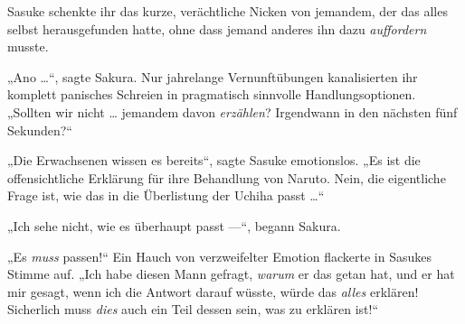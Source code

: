 Sasuke schenkte ihr das kurze, verächtliche Nicken von jemandem, der das alles selbst herausgefunden hatte, ohne dass jemand anderes ihn dazu \emph{auffordern} musste.

„Ano …“, sagte Sakura. Nur jahrelange Vernunftübungen kanalisierten ihr komplett panisches Schreien in pragmatisch sinnvolle Handlungsoptionen.
„Sollten wir nicht … jemandem davon \emph{erzählen}? Irgendwann in den nächsten fünf Sekunden?“

„Die Erwachsenen wissen es bereits“, sagte Sasuke emotionslos.
„Es ist die offensichtliche Erklärung für ihre Behandlung von Naruto. Nein, die eigentliche Frage ist, wie das in die Überlistung der Uchiha passt …“

„Ich sehe nicht, wie es überhaupt passt —“, begann Sakura.

„Es \emph{muss} passen!“ Ein Hauch von verzweifelter Emotion flackerte in Sasukes Stimme auf.
„Ich habe diesen Mann gefragt, \emph{warum} er das getan hat, und er hat mir gesagt, wenn ich die Antwort darauf wüsste, würde das \emph{alles} erklären! Sicherlich muss \emph{dies} auch ein Teil dessen sein, was zu erklären ist!“

